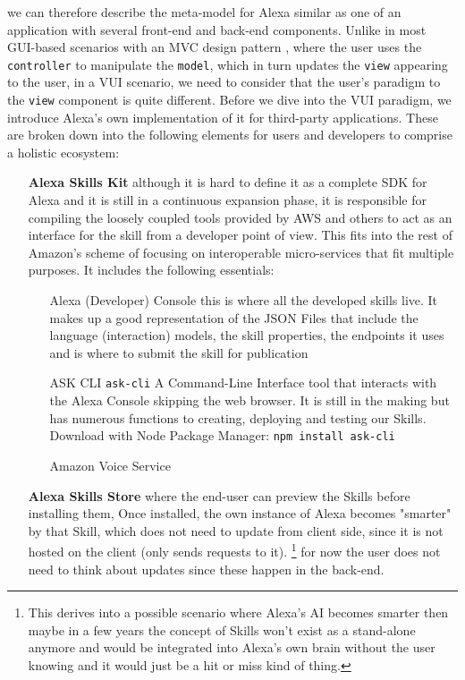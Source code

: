 we can therefore describe the meta-model for Alexa similar as one %
of an application with several front-end and back-end components. Unlike in most GUI-based scenarios with an MVC design pattern \cite{wiki:mvc}, where the user uses the \lstinline|controller| to manipulate the \lstinline|model|, which in turn updates the \lstinline|view| appearing to the user, in a VUI scenario, we need to consider that the user's paradigm to the \lstinline|view| component is quite different. Before we dive into the VUI paradigm, we introduce Alexa's own implementation of it for third-party applications. These are broken down into the following elements for users and developers to comprise a holistic ecosystem:




\begin{itemize}
	\item[\textbf{Alexa Skills Kit}] although it is hard to define it as a complete SDK for Alexa and it is still in a continuous expansion phase, it is responsible for compiling the loosely coupled tools provided by AWS and others to act as an interface for the skill from a developer point of view. This fits into the rest of Amazon's scheme of focusing on interoperable micro-services that fit multiple purposes. It includes the following essentials:
	
	
	\begin{itemize}
		\item [Alexa (Developer) Console] this is where all the developed skills live. It makes up a good representation of the JSON Files that include the language (interaction) models, the skill properties, the endpoints it uses and is where to submit the skill for publication
		\item[ASK CLI] \lstinline|ask-cli| A Command-Line Interface tool that interacts with the Alexa Console skipping the web browser. It is still in the making but has numerous functions to creating, deploying and testing our Skills. Download with Node Package Manager: \texttt{npm install ask-cli}
		\item[Amazon Voice Service] 
	\end{itemize}
	\item[\textbf{Alexa Skills Store}] where the end-user can preview the Skills before installing them, %
	Once installed, the own instance of Alexa becomes "smarter" by that Skill, which does not need to update from client side, since it is not hosted on the client (only sends requests to it). \footnote{This derives into a possible scenario where Alexa's AI becomes smarter then maybe in a few years the concept of Skills won't exist as a stand-alone anymore and would be integrated into Alexa's own brain without the user knowing and it would just be a hit or miss kind of thing.} for now the user does not need to think about updates since these happen in the back-end. 
	

\end{itemize}
